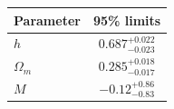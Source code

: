 \begin{tabular} { l  c}

 Parameter &  95\% limits\\
\hline
{\boldmath$h              $} & $0.687^{+0.022}_{-0.023}   $\\

{\boldmath$Ω_m            $} & $0.285^{+0.018}_{-0.017}   $\\

{\boldmath$M              $} & $-0.12^{+0.86}_{-0.83}     $\\
\hline
\end{tabular}